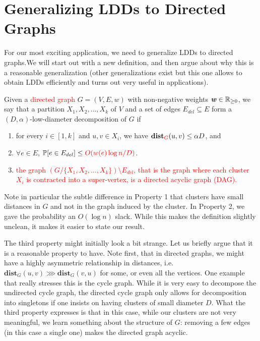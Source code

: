 \section{Generalizing LDDs to Directed Graphs}

For our most exciting application, we need to generalize LDDs to directed graphs.We will start out with a new definition, and then argue about why this is a reasonable generalization (other generalizations exist but this one allows to obtain LDDs efficiently and turns out very useful in applications).

\begin{definition}
Given a \textcolor{red}{directed graph} $G = (V,E,w)$ with non-negative weights $\boldsymbol{\mathit{w}} \in \mathbb{R}_{\geq 0}$, we say that a partition $X_1, X_2, \ldots, X_k$ of $V$ and a set of edges $E_{del} \subseteq E$ form a $(D, \alpha)$-low-diameter decomposition of $G$ if
\begin{enumerate}
\item for every $i \in [1, k]$ and $u,v \in X_i$, we have $\mathbf{dist}_{\textcolor{red}{G}}(u,v) \leq \alpha D$, and
\item $\forall e \in E$, $\mathbb{P}[e \in E_{del}] \leq \textcolor{red}{O(w(e) \log n/ D)}$.
\item \textcolor{red}{the graph $(G / \{X_1, X_2, \ldots, X_k\}) \setminus E_{del}$, that is the graph where each cluster $X_i$ is contracted into a super-vertex, is a directed acyclic graph (DAG).}
\end{enumerate}
\end{definition}

Note in particular the subtle difference in Property 1 that clusters have small distances in $G$ and not in the graph induced by the cluster. In Property 2, we gave the probability an $O(\log n)$ slack. While this makes the definition slightly unclean, it makes it easier to state our result.

The third property might initially look a bit strange. Let us briefly argue that it is a reasonable property to have. Note first, that in directed graphs, we might have a highly asymmetric relationship in distances, i.e. $\mathbf{dist}_G(u,v) \ggg \mathbf{dist}_G(v,u)$ for some, or even all the vertices. One example that really stresses this is the cycle graph. While it is very easy to decompose the undirected cycle graph, the directed cycle graph only allows for decomposition into singletons if one insists on having clusters of small diameter $D$. What the third property expresses is that in this case, while our clusters are not very meaningful, we learn something about the structure of $G$: removing a few edges (in this case a single one) makes the directed graph acyclic. 

